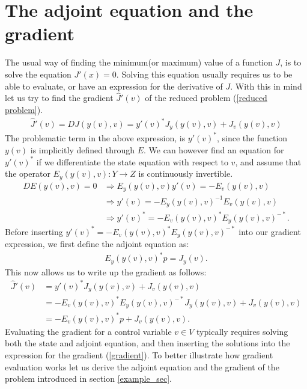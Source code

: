 \section{The adjoint equation and the gradient}
The usual way of finding the minimum(or maximum) value of a function $J$, is to solve the equation $J'(x)=0$. Solving this equation usually requires us to be able to evaluate, or have an expression for the derivative of $J$. With this in mind let us try to find the gradient $\hat{J}'(v)$ of the reduced problem (\ref{reduced problem}).
\begin{align*}
\hat{J}'(v) = DJ(y(v),v) = y'(v)^*J_y(y(v),v) + J_v(y(v),v)
\end{align*}
The problematic term in the above expression, is $y'(v)^*$, since the function $y(v)$ is implicitly defined through $E$. We can however find an equation for $y'(v)^*$ if we differentiate the state equation with respect to $v$, and assume that the operator $E_y(y(v),v):Y\rightarrow Z$ is continuously invertible.
\begin{align*}
DE(y(v),v)=0 &\Rightarrow E_y(y(v),v)y'(v)=-E_v(y(v),v) \\ &\Rightarrow y'(v)=-E_y(y(v),v)^{-1}E_v(y(v),v) \\ &\Rightarrow y'(v)^* = -E_v(y(v),v)^*E_y(y(v),v)^{-*}.
\end{align*}
Before inserting $y'(v)^* = -E_v(y(v),v)^*E_y(y(v),v)^{-*}$ into our gradient expression, we first define the adjoint equation as:
\begin{align}
E_y(y(v),v)^{*}p=J_y(v). \label{general adjoint}
\end{align}
This now allows us to write up the gradient as follows:
\begin{align}
\hat{J}'(v)&= y'(v)^*J_y(y(v),v) + J_v(y(v),v)\\
&=-E_v(y(v),v)^*E_y(y(v),v)^{-*}J_y(y(v),v) + J_v(y(v),v) \\
&= -E_v(y(v),v)^*p +J_v(y(v),v). \label{gradient}
\end{align}
Evaluating the gradient for a control variable $v\in V$ typically requires solving both the state and adjoint equation, and then inserting the solutions into the expression for the gradient (\ref{gradient}). To better illustrate how gradient evaluation works let us derive the adjoint equation and the gradient of the problem introduced in section \ref{example_sec}.
